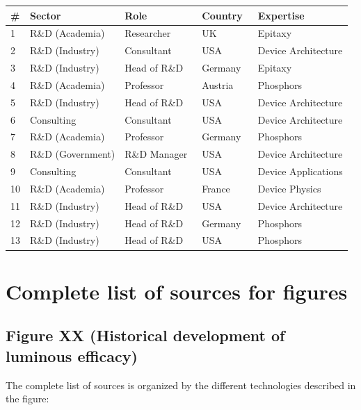 \documentclass[10pt]{article}
\begin{document}
\begin{table}[!ht]
    \centering
    \begin{tabular}{|l|l|l|l|l|}
    \hline
        \# & Sector  & Role  & Country  & Expertise \\ \hline
        1 & R\&D (Academia) & Researcher & UK & Epitaxy \\ \hline
        2 & R\&D (Industry) & Consultant & USA & Device Architecture \\ \hline
        3 & R\&D (Industry) & Head of R\&D & Germany & Epitaxy \\ \hline
        4 & R\&D (Academia) & Professor & Austria & Phosphors \\ \hline
        5 & R\&D (Industry) & Head of R\&D & USA & Device Architecture \\ \hline
        6 & Consulting & Consultant & USA & Device Architecture \\ \hline
        7 & R\&D (Academia) & Professor & Germany & Phosphors \\ \hline
        8 & R\&D (Government) & R\&D Manager  & USA & Device Architecture \\ \hline
        9 & Consulting & Consultant & USA & Device Applications \\ \hline
        10 & R\&D (Academia) & Professor & France & Device Physics \\ \hline
        11 & R\&D (Industry) & Head of R\&D & USA & Device Architecture \\ \hline
        12 & R\&D (Industry) & Head of R\&D & Germany & Phosphors \\ \hline
        13 & R\&D (Industry) & Head of R\&D & USA  & Phosphors \\ \hline
    \end{tabular}
    \label{tab:interviews}
\end{table}

\newpage
\section{Complete list of sources for figures}

\subsection{Figure XX (Historical development of luminous efficacy)}

The complete list of sources is organized by the different technologies described in the figure:
\end{document}
